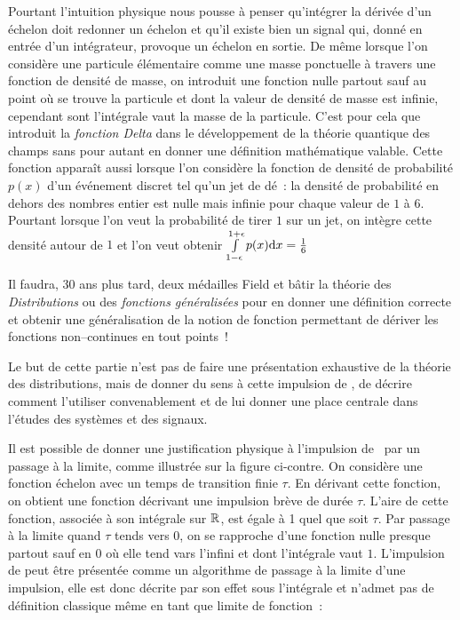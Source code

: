         Pourtant l'intuition physique nous pousse à penser qu'intégrer
        la dérivée d'un échelon doit redonner un échelon et qu'il
        existe bien un signal qui, donné en entrée d'un intégrateur,
        provoque un échelon en sortie. De même lorsque l'on considère
        une particule élémentaire comme une masse ponctuelle à travers
        une fonction de densité de masse, on introduit une fonction
        nulle partout sauf au point où se trouve la particule et dont
        la valeur de densité de masse est infinie, cependant sont
        l'intégrale vaut la masse de la particule. C'est pour cela que
        \Dirac{} introduit la \emph{fonction Delta} dans le
        développement de la théorie quantique des champs sans pour
        autant en donner une définition mathématique valable. Cette
        fonction apparaît aussi lorsque l'on considère la fonction de
        densité de probabilité $p(x)$ d'un événement discret tel qu'un
        jet de dé~: la densité de probabilité en dehors des nombres
        entier est nulle mais infinie pour chaque valeur de $1$ à
        $6$. Pourtant lorsque l'on veut la probabilité de tirer $1$
        sur un jet, on intègre cette densité autour de $1$ et l'on veut
        obtenir
        $\int\limits_{1-\epsilon}^{1+\epsilon}p(x) \mathrm{d{}} x=\frac{1}{6}$

        Il
        faudra, 30 ans plus tard, deux médailles Field et bâtir la
        théorie des \emph{Distributions} ou des \emph{fonctions
          généralisées} pour en donner une définition correcte et
        obtenir une généralisation de la notion de fonction permettant
        de dériver les fonctions non--continues en tout points~!

        Le but de cette partie n'est pas de faire une présentation
        exhaustive de la théorie des distributions, mais de donner du
        sens à cette impulsion de \Dirac, de décrire comment
        l'utiliser convenablement et de lui donner une place centrale
        dans l'études des systèmes et des signaux.

        Il est possible de donner une justification physique à
        l'impulsion de \Dirac{} par un passage à la limite, comme
        illustrée sur la figure ci-contre. On considère une fonction
        échelon avec un temps de transition finie $\tau$. En dérivant
        cette fonction, on obtient une fonction décrivant une
        impulsion brève de durée $\tau$. L'aire de cette fonction,
        associée à son intégrale sur $\mathbb{R}$, est égale à 1 quel que soit
        $\tau$. Par passage à la limite quand $\tau$ tends vers 0, on
        se rapproche d'une fonction nulle presque partout sauf en $0$
        où elle tend vars l'infini et dont l'intégrale vaut
        $1$. L'impulsion de \Dirac{} peut être présentée comme un
        algorithme de passage à la limite d'une impulsion, elle est
        donc décrite par \og{} son effet sous l'intégrale \fg{} et
        n'admet pas de définition classique même en tant que limite de
        fonction~:
	
